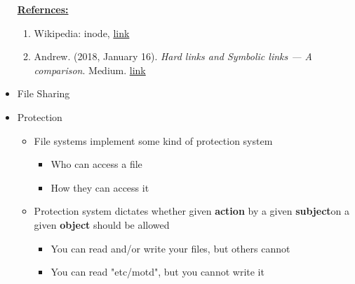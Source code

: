 \documentclass[12pt]{article}
\begin{document}
\begin{itemize}
    \bigskip

    \underline{\textbf{Refernces:}}

    \bigskip

    \begin{enumerate}[1)]
        \item Wikipedia: inode, \href{https://en.wikipedia.org/wiki/Inode}{link}
        \item Andrew. (2018, January 16). \textit{Hard links and Symbolic links — A comparison}. Medium. \href{https://medium.com/@307/hard-links-and-symbolic-links-a-comparison-7f2b56864cdd}{link}
    \end{enumerate}
    \item File Sharing
    \item Protection

    \begin{itemize}
        \item File systems implement some kind of protection system
        \begin{itemize}
            \item Who can access a file
            \item How they can access it
        \end{itemize}
        \item Protection system dictates whether given \color{green}\textbf{action}
        \color{black}\:by a given \color{orange}\textbf{subject}\color{black}\:on
        a given \color{red}\:\textbf{object}\color{black}\: should be allowed
        \begin{itemize}
            \item You can read and/or write your files, but others cannot
            \item You can read "etc/motd", but you cannot write it
        \end{itemize}
    \end{itemize}


\end{itemize}
\end{document}
